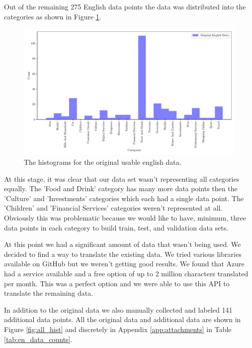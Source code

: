 Out of the remaining 275 English data points the data was distributed into the categories as shown in Figure \ref{fig:original_english_counts}.

\begin{figure}[!ht]
  \centering
  \includegraphics[width=\textwidth]{../img/plot_original_english_counts.pdf}
  \caption{The histograms for the original usable english data.}
  \label{fig:original_english_counts}
\end{figure}

At this stage, it was clear that our data set wasn't representing all categories equally. The 'Food and Drink' category has many more data points then the 'Culture' and 'Investments' categories which each had a single data point. The 'Children' and 'Financial Services' categories weren't represented at all. Obviously this was problematic because we would like to have, minimum, three data points in each category to build train, test, and validation data sets.

At this point we had a significant amount of data that wasn't being used. We decided to find a way to translate the existing data. We tried various libraries available on GitHub but we weren't getting good results. We found that Azure had a service available and a free option of up to 2 million characters translated per month. This was a perfect option and we were able to use this API to translate the remaining data.

In addition to the original data we also manually collected and labeled 141 additional data points. All the original data and additional data are shown in Figure \ref{fig:all_hist} and discretely in Appendix \ref{app:attachments} in Table \ref{tab:en_data_counts}.



